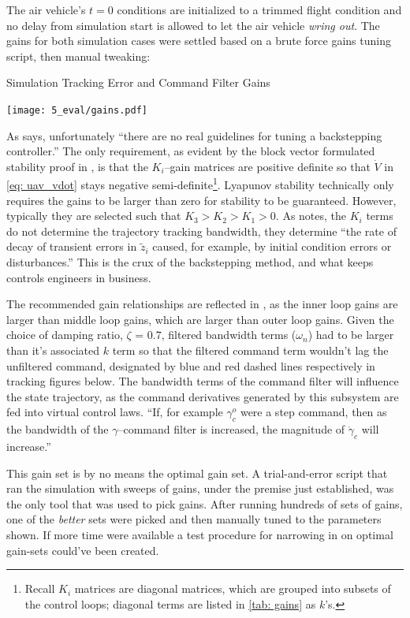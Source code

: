 \documentclass[12pt]{ucthesis}
\begin{document}
The air vehicle's $t=0$ conditions are initialized to a trimmed flight condition and no delay from simulation start is allowed to let the air vehicle \textit{wring out}. The gains for both simulation cases were settled based on a brute force gains tuning script, then manual tweaking:%
%
\begin{table}[H]
	\caption{Simulation Tracking Error and Command Filter Gains}%
	\centering
	\texttt{[image: 5\_eval/gains.pdf]}%
	\label{tab: gains}%
\end{table}
\vspace{-2em}
As \citet[Part VI.A]{Sonneveldt2007} says, unfortunately ``there are no real guidelines for tuning a backstepping controller.'' The only requirement, as evident by the block vector formulated stability proof in , is that the $K_i$--gain matrices are positive definite so that $\dot{V}$ in \autoref{eq: uav_vdot} stays negative semi-definite\footnote{Recall $K_i$ matrices are diagonal matrices, which are grouped into subsets of the control loops; diagonal terms are listed in \autoref{tab: gains} as $k$'s.}. Lyapunov stability technically only requires the gains to be larger than zero for stability to be guaranteed. However, typically they are selected such that $K_3 > K_2 > K_1 > 0$. As \citet[Sec. IX.]{Farrell2005} notes, the $K_i$ terms do not determine the trajectory tracking bandwidth, they determine ``the rate of decay of transient errors in $\tilde{z}_i$ caused, for example, by initial condition errors or disturbances.'' This is the crux of the backstepping method, and what keeps controls engineers in business.

The recommended gain relationships are reflected in , as the inner loop gains are larger than middle loop gains, which are larger than outer loop gains. Given the choice of damping ratio, $\zeta$ = 0.7, filtered bandwidth terms ($\omega_n$) had to be larger than it's associated $k$ term so that the filtered command term wouldn't lag the unfiltered command, designated by blue and red dashed lines respectively in tracking figures below. The bandwidth terms of the command filter will influence the state trajectory, as the command derivatives generated by this subsystem are fed into virtual control laws. ``If, for example $\gamma^o_c$ were a step command, then as the bandwidth of the $\gamma$--command filter is increased, the magnitude of $\dot{\gamma}_c$ will increase.'' \citet{Farrell2006} 

This gain set is by no means the optimal gain set. A trial-and-error script that ran the simulation with sweeps of gains, under the premise just established, was the only tool that was used to pick gains. After running hundreds of sets of gains, one of the \textit{better} sets were picked and then manually tuned to the parameters shown. If more time were available a test procedure for narrowing in on optimal gain-sets could've been created.
%
\end{document}
